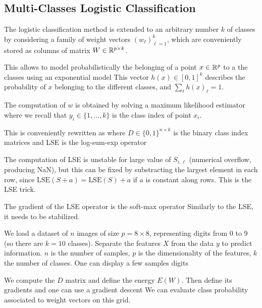 \subsection{Multi-Classes Logistic Classification}

The logistic classification method is extended to an arbitrary number
$k$ of classes by considering a family of weight vectors $ ( w_\ell )_{\ell=1}^k $, which are conveniently stored as columns of matrix $W \in \mathbb{R}^{p \times k}$.

This allows to model probabilistically the belonging of a point $x \in \mathbb{R}^p $ to a
the classes using an exponential model
This vector $h(x) \in [0,1]^k $ describes the probability of $x$
belonging to the different classes, and $ \sum_\ell h(x)_\ell = 1 $.

The computation of $w$ is obtained by solving a maximum likelihood
estimator
where we recall that $y_i \in \{1,\ldots,k\}$ is the class index of
point $x_i$.

This is conveniently rewritten as
where $D \in \{0,1\}^{n \times k}$ is the binary class index matrices
and LSE is the log-sum-exp operator


The computation of LSE is
unstable for large value of $S_{i,\ell}$ (numerical overflow, producing NaN), but this can be
fixed by substracting the largest element in each row,
since $ \text{LSE}(S+a)=\text{LSE}(S)+a $ if $a$ is constant along rows. This is
the LSE trick.


The gradient of the LSE operator is the soft-max operator
Similarly to the LSE, it needs to be stabilized.


We load a dataset of $n$ images of size $p = 8 \times 8$, representing digits from 0
to 9 (so there are $k=10$ classes).
%
Separate the features $X$ from the data $y$ to predict information.
%
$n$ is the number of samples, $p$ is the dimensionality of the features, $k$
the number of classes.
%
One can display a few samples digits



We compute the $D$ matrix and define the energy $E(W)$.
%
Then define its gradients
and one can use a gradient descent
We can evaluate class probability associated to weight vectors on this grid.


